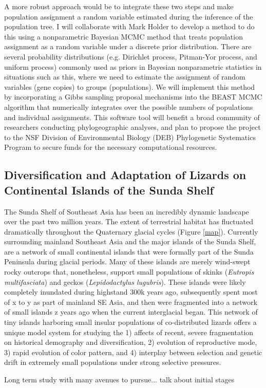 \documentclass[10pt]{article}
\begin{document}
A more robust approach would be to integrate these two steps and make population assignment a random variable estimated during the inference of the population tree.
I will collaborate with Mark Holder to develop a method to do this using a nonparametric Bayesian MCMC method that treats population assignment as a random variable under a discrete prior distribution.
There are several probability distributions (e.g. Dirichlet process, Pitman-Yor process, and uniform process) commonly used as priors in Bayesian nonparametric statistics in situations such as this, where we need to estimate the assignment of random variables (gene copies) to groups (populations).
We will implement this method by incorporating a Gibbs sampling proposal mechanisms into the BEAST MCMC algorithm that numerically integrates over the possible numbers of populations and individual assignments.
This software tool will benefit a broad community of researchers conducting phylogeographic analyses, and plan to propose the project to the NSF Division of Environmental Biology (DEB) Phylogenetic Systematics Program to secure funds for the necessary computational resources.

\subsection*{Diversification and Adaptation of Lizards on Continental Islands of the Sunda Shelf}
The Sunda Shelf of Southeast Asia has been an incredibly dynamic landscape over the past two million years.
The extent of terrestrial habitat has fluctuated dramatically throughout the Quaternary glacial cycles (Figure \ref{map}).
Currently surrounding mainland Southeast Asia and the major islands of the Sunda Shelf, are a network of small continental islands that were formally part of the Sunda Peninsula during glacial periods.
Many of these islands are merely wind-swept rocky outcrops that, nonetheless, support small populations of skinks (\emph{Eutropis multifasciata}) and geckos (\emph{Lepidodactylus lugubris}).
These islands were likely completely inundated during highstand 300k years ago, subsequently spent most of x to y as part of mainland SE Asia, and then were fragmented into a network of small islands z years ago when the current interglacial began.
This network of tiny islands harboring small insular populations of co-distributed lizards offers a unique model system for studying the 
1) affects of recent, severe fragmentation on historical demography and diversification,
2) evolution of reproductive mode,
3) rapid evolution of color pattern, and 
4) interplay between selection and genetic drift in extremely small populations under strong selective pressures.

Long term study with many avenues to pursue... talk about initial stages
\end{document}
